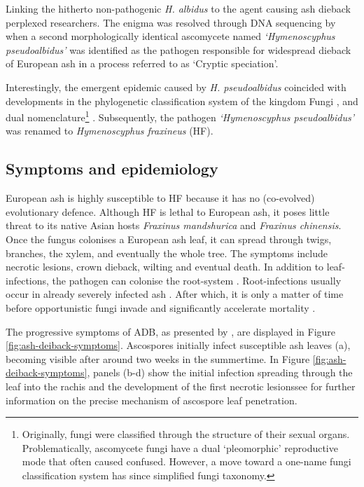 Linking the hitherto non-pathogenic \textit{H. albidus} to the agent causing ash dieback perplexed researchers. 
The enigma was resolved through DNA sequencing by \cite{queloz2011cryptic} when a second morphologically identical
ascomycete named \textit{`Hymenoscyphus pseudoalbidus'} was identified as the pathogen responsible for widespread dieback
of European ash in a process referred to as `Cryptic speciation'.

Interestingly, the emergent epidemic caused by \textit{H. pseudoalbidus} coincided with developments 
in the phylogenetic classification system of the kingdom Fungi \cite{hibbett2007higher}, 
and dual nomenclature\footnote{Originally, fungi were classified through the structure of their sexual organs.
Problematically, ascomycete fungi have a dual `pleomorphic' reproductive mode that often caused confused. 
However, a move toward a one-name fungi classification system has since simplified fungi taxonomy.} 
\cite{wingfield2012one}. Subsequently, the pathogen \textit{`Hymenoscyphus pseudoalbidus'} was renamed to
\textit{Hymenoscyphus fraxineus} (HF).

\subsection{Symptoms and epidemiology}

European ash is highly susceptible to HF because it has no (co-evolved) evolutionary defence.
Although HF is lethal to European ash, it poses little threat to its native Asian hosts 
\textit{Fraxinus mandshurica} and \textit{Fraxinus chinensis}. Once the fungus colonises a European ash leaf,
it can spread through twigs, branches, the xylem, and eventually the whole tree.
The symptoms include necrotic lesions, crown dieback, wilting and eventual death.
In addition to leaf-infections, the pathogen can colonise the root-system \cite{schumacher2011general}.
Root-infections usually occur in already severely infected ash \cite{https://doi.org/10.1111/mpp.12073}. 
After which, it is only a matter of time before opportunistic fungi invade and significantly accelerate mortality
\cite{enderle2013temporal}.

The progressive symptoms of ADB, as presented by \cite{gross2014h}, are displayed in Figure \ref{fig:ash-deiback-symptoms}.
Ascospores initially infect susceptible ash leaves (a), 
becoming visible after around two weeks \cite{https://doi.org/10.1111/ppa.12048} in the summertime. 
In Figure \ref{fig:ash-deiback-symptoms}, panels (b-d) show the initial infection spreading through 
the leaf into the rachis and the development of the first necrotic lesions\textemdash see
\cite{https://doi.org/10.1111/ppa.12844} for further information on the precise mechanism of ascospore leaf penetration.

